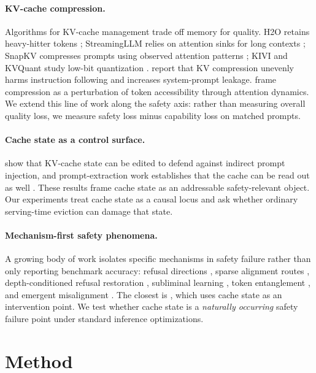 \documentclass[11pt]{article}
\begin{document}
\paragraph{KV-cache compression.}
Algorithms for KV-cache management trade off memory for quality. H2O retains heavy-hitter tokens \citep{zhang2023h2o}; StreamingLLM relies on attention sinks for long contexts \citep{xiao2024streamingllm}; SnapKV compresses prompts using observed attention patterns \citep{li2024snapkv}; KIVI and KVQuant study low-bit quantization \citep{liu2024kivi,hooper2024kvquant}. \citet{chen2025pitfalls} report that KV compression unevenly harms instruction following and increases system-prompt leakage. \citet{ananthanarayanan2026physics} frame compression as a perturbation of token accessibility through attention dynamics. We extend this line of work along the safety axis: rather than measuring overall quality loss, we measure safety loss minus capability loss on matched prompts.

\paragraph{Cache state as a control surface.}
\citet{wang2025cacheprune} show that KV-cache state can be edited to defend against indirect prompt injection, and prompt-extraction work establishes that the cache can be read out as well \citep{hui2024pleak}. These results frame cache state as an addressable safety-relevant object. Our experiments treat cache state as a causal locus and ask whether ordinary serving-time eviction can damage that state.

\paragraph{Mechanism-first safety phenomena.}
A growing body of work isolates specific mechanisms in safety failure rather than only reporting benchmark accuracy: refusal directions \citep{arditi2024refusal,joad2026more_refusal}, sparse alignment routes \citep{frank2026alignmentroutes}, depth-conditioned refusal restoration \citep{zhang2026anydepth}, subliminal learning \citep{cloud2025subliminal}, token entanglement \citep{zur2025token}, and emergent misalignment \citep{betley2025emergent}. The closest is \citet{wang2025cacheprune}, which uses cache state as an intervention point. We test whether cache state is a \emph{naturally occurring} safety failure point under standard inference optimizations.

\section{Method}
\end{document}
